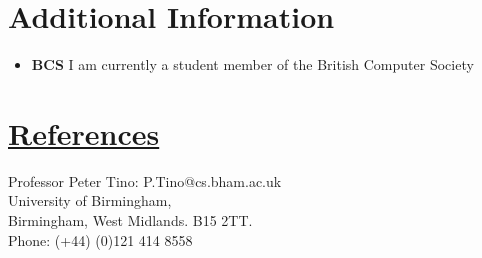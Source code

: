 \documentclass[11pt]{article}
\begin{document}
	\vspace{-20pt}
	\hspace{-100pt}\section*{Additional Information}
		\begin{itemize}
			\item \textbf{BCS} I am currently a student member of the British Computer Society
		\end{itemize}

				
	\vspace{-20pt}
	\hspace{-100pt}\section*{\underline{References}}	
				Professor Peter Tino:  P.Tino@cs.bham.ac.uk  \\
				University of Birmingham,\\
				Birmingham, 
				West Midlands.
				B15 2TT.\\
				Phone: (+44) (0)121 414 8558\\
				
\end{document}
